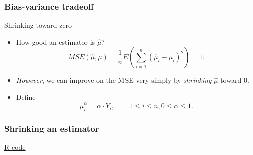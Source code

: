 \documentclass[handout]{beamer}
\begin{document}
   \begin{frame} \frametitle{Bias-variance tradeoff}

   \begin{block}
   {Shrinking toward zero}
   \begin{itemize}

   \item How good an estimator is $\widehat{\mu}$?
   $$
   MSE(\widehat{\mu}, \mu) = \frac{1}{n} E(\sum_{i=1}^n (\widehat{\mu}_i -\mu_i)^2)  = 1.$$
   \item {\em However}, we can improve on the MSE very simply by {\em shrinking}
   $\widehat{\mu}$  toward 0.

   \item Define
   $$
   \widehat{\mu}^{\alpha}_i = \alpha \cdot Y_i, \qquad 1 \leq i \leq n, 0 \leq \alpha \leq 1.$$

   \end{itemize}
   \end{block}
   \end{frame}



   \begin{frame}
   \frametitle{Shrinking an estimator}
   \begin{center}
   \end{center}
   \href{http://stats191.stanford.edu/selection.html#bias-variance-tradeoff}{R code}
   \end{frame}


   \begin{frame} 

   \end{frame}

   
\end{document}
